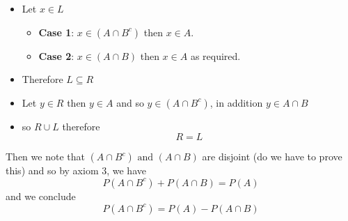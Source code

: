 \documentclass[11pt]{book}
\begin{document}
\begin{itemize}
    \item Let $x \in L$ 
        \begin{itemize}
            \item \textbf{Case 1}: $x\in \left( A\cap B^{c}  \right) $ then $x\in A$. 
            \item \textbf{Case 2}: $x\in \left( A\cap B \right) $ then $x\in A$ as required.
        \end{itemize}
    \item Therefore $L \subseteq R$ 
    \item Let $y \in R$ then $y \in A$ and so $y \in \left( A\cap B^{c}  \right) $, in addition $y \in A\cap B$ 
    \item so $R \cup L$ therefore 
        \[
        \boxed{R = L}
        \]
\end{itemize}

Then we note that $\left( A\cap B^{c}  \right) \text{ and } \left( A\cap B \right) $ are disjoint (do we have to prove this) and so by axiom 3, we have 
\[
P\left(A\cap B^{c} \right)  + P\left(A\cap B\right) = P\left(A\right) 
\]
and we conclude
\[
    \boxed{P\left(A\cap B^{c} \right) = P\left(A\right)  - P\left(A\cap B\right) }
\]





\end{document}
